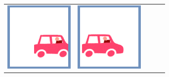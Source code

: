 \documentclass[12pt]{article}
\begin{document}
\begin{minipage}{\textwidth}
\begin{table}[H]
\begin{tabulary}{\linewidth}{|C|CCCC|}
				\vspace{0.01cm}\includegraphics[width=\linewidth]{option4} &
				\vspace{0.01cm}\includegraphics[width=\linewidth]{option2} &

\end{tabulary}
\end{table}
\end{minipage}
\end{document}
